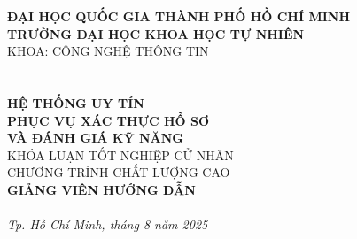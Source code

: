 \begin{titlepage}
  \begin{center}
    {\large \textbf{ĐẠI HỌC QUỐC GIA THÀNH PHỐ HỒ CHÍ MINH}} \\
    \smallskip
    {\large \textbf{TRƯỜNG ĐẠI HỌC KHOA HỌC TỰ NHIÊN}} \\
    \medskip
    KHOA: CÔNG NGHỆ THÔNG TIN \\[2cm]

    {\Large \bfseries \studentone} \\
    {\Large \bfseries \studenttwo} \\[2cm]

    {\huge \bfseries HỆ THỐNG UY TÍN \\ PHỤC VỤ XÁC THỰC HỒ SƠ \\[3mm] VÀ ĐÁNH GIÁ KỸ NĂNG} \\[2cm]

    {\large KHÓA LUẬN TỐT NGHIỆP CỬ NHÂN} \\
    {\large CHƯƠNG TRÌNH CHẤT LƯỢNG CAO} \\[2cm]

    {\Large \textbf{GIẢNG VIÊN HƯỚNG DẪN}} \\
    \medskip
    {\large \instructor} \\

    \vfill
    \textit{Tp. Hồ Chí Minh, tháng 8 năm 2025}
  \end{center}
\end{titlepage}